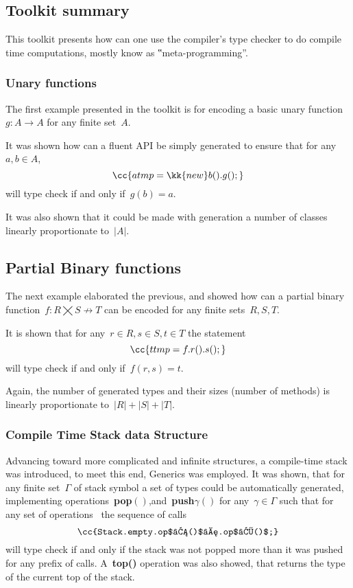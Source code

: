 
\subsection{Toolkit summary}
This toolkit presents how can one use the \Java compiler's
type checker to do compile time computations, mostly know as
‟meta-programming”.

\subsubsection*{Unary functions}
The first example presented in the toolkit is for encoding a
basic unary function~$g:A→A$ for any finite set~$A$.

It was shown how can a fluent API be simply generated
to ensure that for any~$a,b∈A$,
\[
  \cc{a tmp = \kk{new} b().g();}
\]
will type check if and only if~$g(b)=a$.

It was also shown that it could be made with generation
a number of classes linearly proportionate to~$|A|$.

\subsection*{Partial Binary functions}
The next example elaborated the previous, and showed
how can a partial binary function~$f:R⨉S↛T$
can be encoded for any finite sets~$R,S,T$.

It is shown that for any~$r∈R, s∈S, t∈T$
the statement
\[
  \cc{t tmp = f.r().s();}
\]
will type check if and only if~$f(r,s)=t$.

Again, the number of generated types and their sizes (number of methods)
is linearly proportionate to~$|R|+|S|+|T|$.

\subsubsection*{Compile Time Stack data Structure}
Advancing toward more complicated and infinite structures,
a compile-time stack was introduced, to meet this end,
\Java Generics was employed.
It was shown, that for any finite set~$Γ$ of stack symbol a set of \Java types
could be automatically generated, implementing
operations~\textbf{pop$()$},and~\textbf{push$γ()$} for any~$γ∈Γ$ such that for
any set of operations~ the sequence of calls\[
\cc{Stack.empty.op$₁()$….op$ₖ()$;} \] will type check if and only if the stack
was not popped more than it was pushed for any prefix of calls.  A~\textbf{top()}
operation was also showed, that returns the type of the current top of the
stack.

